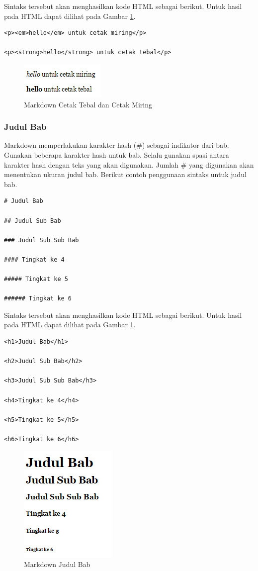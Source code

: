 Sintaks tersebut akan menghasilkan kode HTML sebagai berikut. Untuk hasil pada
HTML dapat dilihat pada Gambar \ref{fig:cmct}.

\begin{lstlisting}
<p><em>hello</em> untuk cetak miring</p>

<p><strong>hello</strong> untuk cetak tebal</p>
\end{lstlisting}

\begin{figure}[H]
\centering
\includegraphics[scale=1]{Gambar/cmct.png}
\caption[Markdown Cetak Tebal dan Cetak Miring]{Markdown Cetak Tebal dan
Cetak Miring}
\label{fig:cmct}
\end{figure}
	
\subsubsection{Judul Bab}
Markdown memperlakukan karakter hash (\#) sebagai indikator dari bab. Gunakan
beberapa karakter hash untuk bab. Selalu gunakan spasi antara karakter hash
dengan teks yang akan digunakan. Jumlah \# yang digunakan akan menentukan ukuran
judul bab. Berikut contoh penggunaan sintaks untuk judul bab.
\begin{lstlisting}
# Judul Bab

## Judul Sub Bab

### Judul Sub Sub Bab

#### Tingkat ke 4

##### Tingkat ke 5

###### Tingkat ke 6
\end{lstlisting}
Sintaks tersebut akan menghasilkan kode HTML sebagai berikut. Untuk hasil pada
HTML dapat dilihat pada Gambar \ref{fig:cmct}.
\begin{lstlisting}
<h1>Judul Bab</h1>

<h2>Judul Sub Bab</h2>

<h3>Judul Sub Sub Bab</h3>

<h4>Tingkat ke 4</h4>

<h5>Tingkat ke 5</h5>

<h6>Tingkat ke 6</h6>
\end{lstlisting}
\begin{figure}[H]
\centering
\includegraphics[scale=1]{Gambar/judulbab.png}
\caption[Markdown Judul Bab]{Markdown Judul Bab}
\label{fig:judulbab}
\end{figure}

